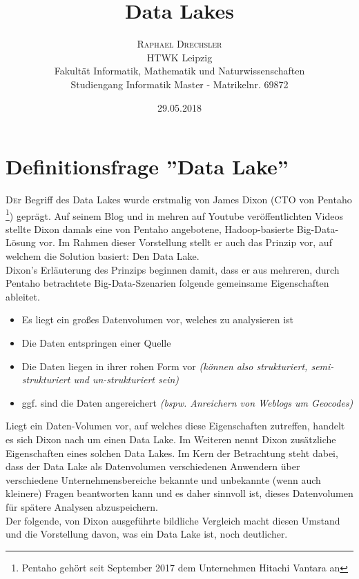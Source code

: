 \documentclass[twoside,twocolumn]{article}
\title{Data Lakes} %
\author{%
\textsc{Raphael Drechsler}\\[1ex] %
\normalsize HTWK Leipzig \\ 
\normalsize Fakultät Informatik, Mathematik und Naturwissenschaften\\ 
\normalsize Studiengang Informatik Master - Matrikelnr. 69872\\%
}
\date{29.05.2018} %
\begin{document}
\maketitle


\section{Definitionsfrage ''Data Lake''}
\lettrine[nindent=0em,lines=2]{D}er Begriff des Data Lakes wurde erstmalig von James Dixon (CTO von Pentaho \footnote{Pentaho gehört seit September 2017 dem Unternehmen Hitachi Vantara an}) geprägt. Auf seinem Blog \cite{src5}  und in mehren auf Youtube veröffentlichten Videos \cite{src6} stellte Dixon damals eine von Pentaho angebotene, Hadoop-basierte Big-Data-Lösung vor. Im Rahmen dieser Vorstellung stellt er auch das Prinzip vor, auf welchem die Solution basiert: Den Data Lake.\\
Dixon's Erläuterung des Prinzips beginnen damit, dass er aus mehreren, durch Pentaho betrachtete Big-Data-Szenarien folgende gemeinsame Eigenschaften ableitet. 
\begin{itemize}
	\item Es liegt ein großes Datenvolumen vor, welches zu analysieren ist
	\item Die Daten entspringen einer Quelle
	\item Die Daten liegen in ihrer rohen Form vor \textit{(können also strukturiert, semi-strukturiert und un-strukturiert sein)}
	\item ggf. sind die Daten angereichert \textit{(bspw. Anreichern von Weblogs um Geocodes)}
\end{itemize}

\noindent Liegt ein Daten-Volumen vor, auf welches diese Eigenschaften zutreffen, handelt es sich Dixon nach um einen Data Lake. Im Weiteren nennt Dixon zusätzliche Eigenschaften eines solchen Data Lakes. Im Kern der Betrachtung steht dabei, dass der Data Lake als Datenvolumen verschiedenen Anwendern über verschiedene Unternehmensbereiche bekannte und unbekannte (wenn auch kleinere) Fragen beantworten kann und es daher sinnvoll ist, dieses Datenvolumen für spätere Analysen abzuspeichern.\\
Der folgende, von Dixon ausgeführte bildliche Vergleich macht diesen Umstand und die Vorstellung davon, was ein Data Lake ist, noch deutlicher.
\end{document}
